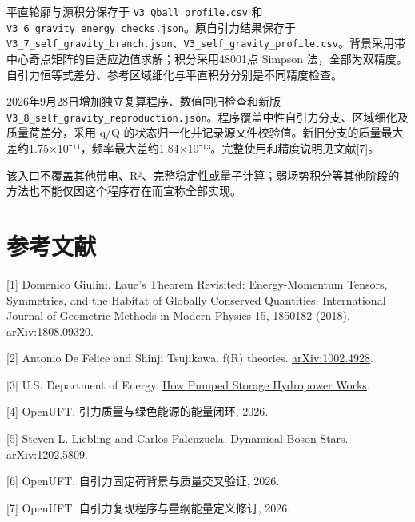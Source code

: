 \documentclass[UTF8,fontset=fandol,11pt]{ctexart}
\begin{document}
平直轮廓与源积分保存于 \texttt{V3\_Qball\_profile.csv} 和 \texttt{V3\_6\_gravity\_energy\_checks.json}。原自引力结果保存于 \texttt{V3\_7\_self\_gravity\_branch.json}、\texttt{V3\_self\_gravity\_profile.csv}。背景采用带中心奇点矩阵的自适应边值求解；积分采用48001点 Simpson 法，全部为双精度。自引力恒等式差分、参考区域细化与平直积分分别是不同精度检查。

2026年9月28日增加独立复算程序、数值回归检查和新版 \texttt{V3\_8\_self\_gravity\_reproduction.json}。程序覆盖中性自引力分支、区域细化及质量荷差分，采用 q/Q 的状态归一化并记录源文件校验值。新旧分支的质量最大差约1.75×10⁻¹¹，频率最大差约1.84×10⁻¹³。完整使用和精度说明见文献[7]。

该入口不覆盖其他带电、R²、完整稳定性或量子计算；弱场势积分等其他阶段的方法也不能仅因这个程序存在而宣称全部实现。

\section*{参考文献}

[1] Domenico Giulini. Laue's Theorem Revisited: Energy-Momentum Tensors, Symmetries, and the Habitat of Globally Conserved Quantities. International Journal of Geometric Methods in Modern Physics 15, 1850182 (2018). \href{https://arxiv.org/abs/1808.09320}{arXiv:1808.09320}.

[2] Antonio De Felice and Shinji Tsujikawa. f(R) theories. \href{https://arxiv.org/abs/1002.4928}{arXiv:1002.4928}.

[3] U.S. Department of Energy. \href{https://www.energy.gov/cmei/water/how-pumped-storage-hydropower-works}{How Pumped Storage Hydropower Works}.

[4] OpenUFT. 引力质量与绿色能源的能量闭环, 2026.

[5] Steven L. Liebling and Carlos Palenzuela. Dynamical Boson Stars. \href{https://arxiv.org/abs/1202.5809}{arXiv:1202.5809}.

[6] OpenUFT. 自引力固定荷背景与质量交叉验证, 2026.

[7] OpenUFT. 自引力复现程序与量纲能量定义修订, 2026.
\end{document}
